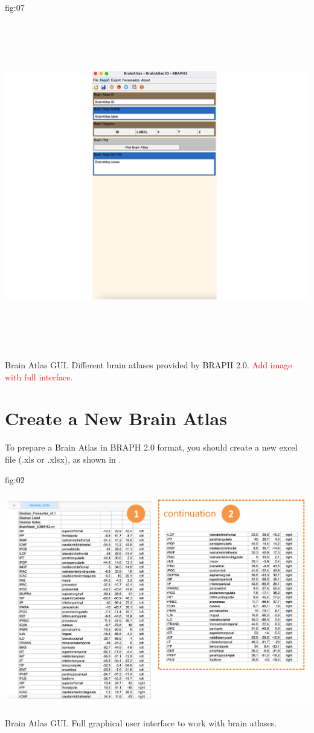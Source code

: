 \documentclass{tufte-handout}
\begin{document}
	{fig:07}
	{\includegraphics[height=15cm]{tut_ba/fig7.png}}
	{Brain Atlas GUI.}
	{
	Different brain atlases provided by BRAPH 2.0. 
	\textcolor{red}{Add image with full interface.}
	}

\clearpage
\section{Create a New Brain Atlas}

To prepare a Brain Atlas in BRAPH 2.0 format, you should create a new excel file (.xls or .xlsx), as shown in . 

	{fig:02}
	{\includegraphics[height=10cm]{tut_ba/fig2.png}}
	{Brain Atlas GUI.}
	{
	Full graphical user interface to work with brain atlases. 
	}
\end{document}
